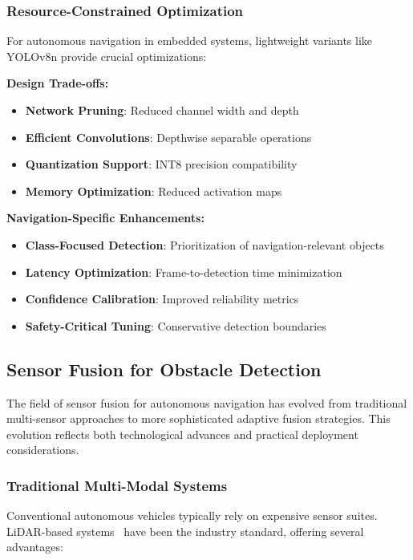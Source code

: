 \documentclass[12pt,oneside]{book}
\begin{document}
\subsubsection{Resource-Constrained Optimization}
For autonomous navigation in embedded systems, lightweight variants like YOLOv8n provide crucial optimizations:

\textbf{Design Trade-offs:}
\begin{itemize}
    \item \textbf{Network Pruning}: Reduced channel width and depth
    \item \textbf{Efficient Convolutions}: Depthwise separable operations
    \item \textbf{Quantization Support}: INT8 precision compatibility
    \item \textbf{Memory Optimization}: Reduced activation maps
\end{itemize}

\textbf{Navigation-Specific Enhancements:}
\begin{itemize}
    \item \textbf{Class-Focused Detection}: Prioritization of navigation-relevant objects
    \item \textbf{Latency Optimization}: Frame-to-detection time minimization
    \item \textbf{Confidence Calibration}: Improved reliability metrics
    \item \textbf{Safety-Critical Tuning}: Conservative detection boundaries
\end{itemize}

\subsection{Sensor Fusion for Obstacle Detection}

The field of sensor fusion for autonomous navigation has evolved from traditional multi-sensor approaches to more sophisticated adaptive fusion strategies. This evolution reflects both technological advances and practical deployment considerations.

\subsubsection{Traditional Multi-Modal Systems}
Conventional autonomous vehicles typically rely on expensive sensor suites. LiDAR-based systems~\cite{geiger2012we} have been the industry standard, offering several advantages:
\end{document}
